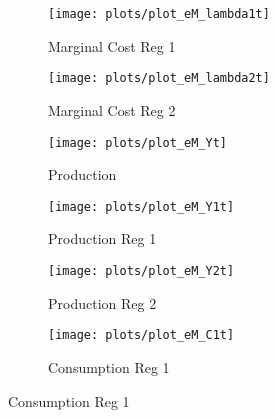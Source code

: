 \documentclass[../thesis.tex]{subfiles}
\begin{document}
\begin{figure}[h!]
		\begin{subfigure}[b]{0.25\textwidth}
			\centering
			\texttt{[image: plots/plot\_eM\_lambda1t]}
			\caption{\footnotesize Marginal Cost Reg 1}
			\label{fig:ZMt-lambda1t}
		\end{subfigure}
		\hfill
		\begin{subfigure}[b]{0.25\textwidth}
			\centering
			\texttt{[image: plots/plot\_eM\_lambda2t]}
			\caption{\footnotesize Marginal Cost Reg 2}
			\label{fig:ZMt-lambda2t}
		\end{subfigure}
		\hfill
		\begin{subfigure}[b]{0.25\textwidth}
			\centering
			\texttt{[image: plots/plot\_eM\_Yt]}
			\caption{\footnotesize Production}
			\label{fig:ZMt-Yt}
		\end{subfigure}
		\hfill		
		\vspace*{0.5cm}

	
		\begin{subfigure}[b]{0.25\textwidth}
			\centering
			\texttt{[image: plots/plot\_eM\_Y1t]}
			\caption{\footnotesize Production Reg 1}
			\label{fig:ZMt-Y1t}
		\end{subfigure}
		\hfill
		\begin{subfigure}[b]{0.25\textwidth}
			\centering
			\texttt{[image: plots/plot\_eM\_Y2t]}
			\caption{\footnotesize Production Reg 2}
			\label{fig:ZMt-Y2t}
		\end{subfigure}
		\hfill
		\begin{subfigure}[b]{0.25\textwidth}
			\centering
			\texttt{[image: plots/plot\_eM\_C1t]}
			\caption{\footnotesize Consumption Reg 1}
			\label{fig:ZMt-C1t}
		\end{subfigure}
		\hfill
		\vspace*{0.5cm}
		


\end{figure}
\end{document}
